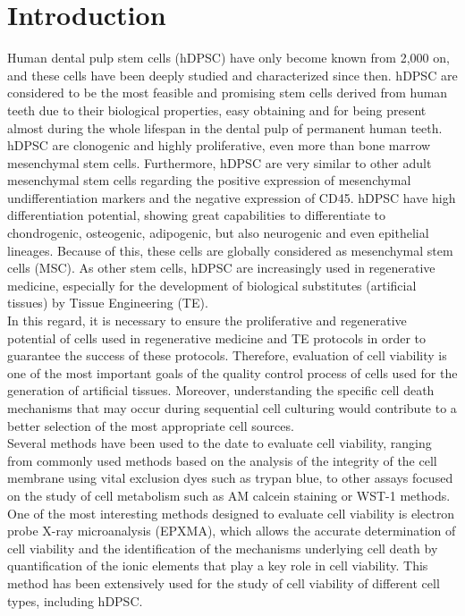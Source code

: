 \documentclass[a4paper,twocolumn,12pt]{article}
\begin{document}
\section{Introduction}
Human dental pulp stem cells (hDPSC) have only become known from 2,000 on, and these cells have been deeply studied and characterized since then. hDPSC are considered to be the most feasible and promising stem cells derived from human teeth due to their biological properties, easy obtaining and for being present almost during the whole lifespan in the dental pulp of permanent human teeth. hDPSC are clonogenic and highly proliferative, even more than bone marrow mesenchymal stem cells. Furthermore, hDPSC are very similar to other adult mesenchymal stem cells regarding the positive expression of mesenchymal undifferentiation markers and the negative expression of CD45. hDPSC have high differentiation potential, showing great capabilities to differentiate to chondrogenic, osteogenic, adipogenic, but also neurogenic and even epithelial lineages. Because of this, these cells are globally considered as mesenchymal stem cells (MSC). As other stem cells, hDPSC are increasingly used in regenerative medicine, especially for the development of biological substitutes (artificial tissues) by Tissue Engineering (TE).\\
In this regard, it is necessary to ensure the proliferative and regenerative potential of cells used in regenerative medicine and TE protocols in order to guarantee the success of these protocols. Therefore, evaluation of cell viability is one of the most important goals of the quality control process of cells used for the generation of artificial tissues. Moreover, understanding the specific cell death mechanisms that may occur during sequential cell culturing would contribute to a better selection of the most appropriate cell sources.\\
Several methods have been used to the date to evaluate cell viability, ranging from commonly used methods based on the analysis of the integrity of the cell membrane using vital exclusion dyes such as trypan blue, to other assays focused on the study of cell metabolism such as AM calcein staining or WST-1 methods. One of the most interesting methods designed to evaluate cell viability is electron probe X-ray microanalysis (EPXMA), which allows the accurate determination of cell viability and the identification of the mechanisms underlying cell death by quantification of the ionic elements that play a key role in cell viability. This method has been extensively used for the study of cell viability of different cell types, including hDPSC.\\
\end{document}
